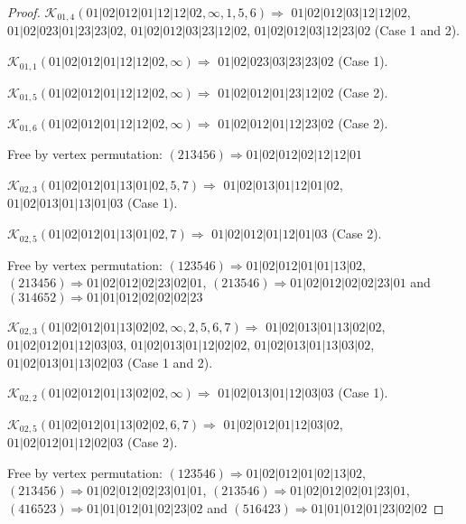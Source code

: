 \documentclass[12pt]{article}
\theoremstyle{plain}
\theoremstyle{definition}
\theoremstyle{remark}
\newcommand{\fancy}[1]{\mathcal{#1}}
\def\K{\fancy{K}}
\begin{document}
\begin{proof}
	
	
	\bigskip
	
	$\K_{01,4}(01|02|012|01|12|12|02,\infty,1, 5, 6)\Rightarrow $ $01|02|012|03|12|12|02$, $01|02|023|01|23|23|02$, $01|02|012|03|23|12|02$, $01|02|012|03|12|23|02$ (Case 1 and 2).
	
	$\K_{01,1}(01|02|012|01|12|12|02,\infty)\Rightarrow $ $01|02|023|03|23|23|02$ (Case 1).
	
	$\K_{01,5}(01|02|012|01|12|12|02,\infty)\Rightarrow $ $01|02|012|01|23|12|02$ (Case 2).
	
	$\K_{01,6}(01|02|012|01|12|12|02,\infty)\Rightarrow $ $01|02|012|01|12|23|02$ (Case 2).
	
	
	
	Free by vertex permutation: $(2 1 3 4 5 6)\Rightarrow 01|02|012|02|12|12|01$
	
	
	
	\bigskip
	
	$\K_{02,3}(01|02|012|01|13|01|02,5, 7)\Rightarrow $ $01|02|013|01|12|01|02$, $01|02|013|01|13|01|03$ (Case 1).
	
	$\K_{02,5}(01|02|012|01|13|01|02,7)\Rightarrow $ $01|02|012|01|12|01|03$ (Case 2).
	
	
	
	Free by vertex permutation: $(1 2 3 5 4 6)\Rightarrow 01|02|012|01|01|13|02$, $(2 1 3 4 5 6)\Rightarrow 01|02|012|02|23|02|01$, $(2 1 3 5 4 6)\Rightarrow 01|02|012|02|02|23|01$ and $(3 1 4 6 5 2)\Rightarrow 01|01|012|02|02|02|23$
	
	
	
	\bigskip
	
	$\K_{02,3}(01|02|012|01|13|02|02,\infty,2, 5, 6, 7)\Rightarrow $ $01|02|013|01|13|02|02$, $01|02|012|01|12|03|03$, $01|02|013|01|12|02|02$, $01|02|013|01|13|03|02$, $01|02|013|01|13|02|03$ (Case 1 and 2).
	
	$\K_{02,2}(01|02|012|01|13|02|02,\infty)\Rightarrow $ $01|02|013|01|12|03|03$ (Case 1).
	
	$\K_{02,5}(01|02|012|01|13|02|02,6, 7)\Rightarrow $ $01|02|012|01|12|03|02$, $01|02|012|01|12|02|03$ (Case 2).
	
	
	
	Free by vertex permutation: $(1 2 3 5 4 6)\Rightarrow 01|02|012|01|02|13|02$, $(2 1 3 4 5 6)\Rightarrow 01|02|012|02|23|01|01$, $(2 1 3 5 4 6)\Rightarrow 01|02|012|02|01|23|01$, $(4 1 6 5 2 3)\Rightarrow 01|01|012|01|02|23|02$ and $(5 1 6 4 2 3)\Rightarrow 01|01|012|01|23|02|02$
	
	
	

\end{proof}
\end{document}
